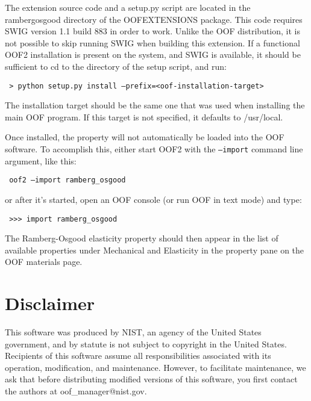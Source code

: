 \documentclass[10pt]{article}
\begin{document}
The extension source code and a setup.py script are located in the
ramberg\-osgood directory of the OOFEXTENSIONS package.  This code
requires SWIG version 1.1 build 883 in order to work. Unlike the OOF
distribution, it is not possible to skip running SWIG when building
this extension.  If a functional OOF2 installation is present on the
system, and SWIG is available, it should be sufficient to cd to the
directory of the setup script, and run:
\begin{obeylines}
\tt{
> python setup.py install --prefix=<oof-installation-target>
}
\end{obeylines}
The installation target should be the same one that was used when
installing the main OOF program. If this target is not specified, it
defaults to /usr/local.

Once installed, the property will not automatically be loaded into the
OOF software. To accomplish this, either start OOF2 with the
{\tt--import} command line argument, like this:
\begin{obeylines}
\tt
  oof2 --import ramberg\_osgood
\end{obeylines}
or after it's started, open an OOF console (or run OOF in
text mode) and type:
\begin{obeylines}
\tt{
>>> import ramberg\_osgood
}
\end{obeylines}
The Ramberg-Osgood elasticity property should then appear in the list
of available properties under Mechanical and Elasticity in the
property pane on the OOF materials page.

\section{Disclaimer}

This software was produced by NIST, an agency of the United States
government, and by statute is not subject to copyright in the United
States. Recipients of this software assume all responsibilities
associated with its operation, modification, and maintenance. However,
to facilitate maintenance, we ask that before distributing modified
versions of this software, you first contact the authors at
oof\_manager@nist.gov.
\end{document}
